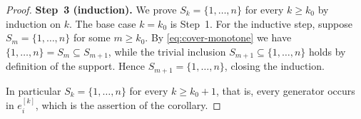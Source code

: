 \documentclass[10pt,a4paper]{amsart}
\begin{document}
\begin{proof}
\medskip
\noindent\textbf{Step~3 (induction).}
We prove $S_k=\{1,\ldots,n\}$ for every $k\ge k_0$ by induction on
$k$.  The base case $k=k_0$ is Step~1.  For the inductive step,
suppose $S_m=\{1,\ldots,n\}$ for some $m\ge k_0$.  By
\eqref{eq:cover-monotone} we have
$\{1,\ldots,n\}=S_m\subseteq S_{m+1}$, while the trivial inclusion
$S_{m+1}\subseteq\{1,\ldots,n\}$ holds by definition of the support.
Hence $S_{m+1}=\{1,\ldots,n\}$, closing the induction.

In particular $S_k=\{1,\ldots,n\}$ for every $k\ge k_0+1$, that is,
every generator occurs in $e_i^{[k]}$, which is the assertion of the
corollary.
\end{proof}
\end{document}
